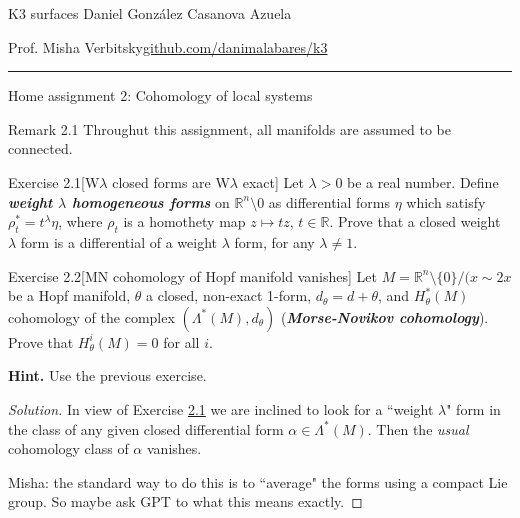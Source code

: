 
\setcounter{secnumdepth}{2}



\begin{minipage}{\textwidth}
	\begin{minipage}{1\textwidth}
		K3 surfaces \hfill Daniel González Casanova Azuela
		
		{\small Prof. Misha Verbitsky\hfill\href{https://github.com/danimalabares/k3}{github.com/danimalabares/k3}}
	\end{minipage}
\end{minipage}\vspace{.2cm}\hrule

\vspace{10pt}
{\huge Home assignment 2: Cohomology of local systems}

\begin{thing5}{Remark 2.1}\label{rk:2.1}\leavevmode
Throughut this assignment, all manifolds are assumed to be connected.
\end{thing5}

\begin{thing4}{Exercise 2.1}[W\(\lambda\) closed forms are W\(\lambda\) exact]\label{exer:2.1}\leavevmode
Let \(\lambda>0\) be a real number. Define \textit{\textbf{weight \(\lambda\) homogeneous forms}} on \(\mathbb{R}^n\setminus 0\) as differential forms \(\eta\) which satisfy \(\rho_t^*=t^\lambda \eta\), where \(\rho_t\) is a homothety map \(z \mapsto  tz\), \(t \in \mathbb{R}\). Prove that a closed weight \(\lambda\) form is a differential of a weight \(\lambda\) form, for any \(\lambda \neq 1\).
\end{thing4}

\begin{thing4}{Exercise 2.2}[MN cohomology of Hopf manifold vanishes]\label{exer:2.2}\leavevmode
Let \(M=\mathbb{R}^n\setminus\{0\}\Big/(x \sim 2x\) be a Hopf manifold, \(\theta\) a closed, non-exact 1-form, \(d_\theta=d+\theta\), and \(H^*_\theta(M)\) cohomology of the complex \((\Lambda^*(M),d_\theta)\) (\textit{\textbf{Morse-Novikov cohomology}}). Prove that \(H^i_\theta(M)=0\) for all \(i\).
\end{thing4}

\textbf{Hint.} Use the previous exercise.

\begin{proof}[Solution]\leavevmode
In view of Exercise \hyperref[exer:2.1]{2.1} we are inclined to look for a ``weight \(\lambda\)" form in the class of any given closed differential form \(\alpha \in \Lambda^{*}(M)\). Then the \textit{usual} cohomology class of \(\alpha\) vanishes.

{\color{6}Misha:} the standard way to do this is to ``average" the forms using a compact Lie group. So maybe ask GPT to what this means exactly.
\end{proof}


